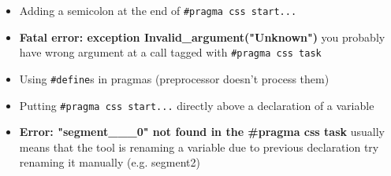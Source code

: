 \documentclass[letterpaper]{article}
\begin{document}
\begin{itemize}
  \item Adding a semicolon at the end of \verb!#pragma css start...!
  \item \textbf{{Fatal error: exception Invalid\_argument("Unknown")}} you
      probably have wrong argument at a call tagged with \verb!#pragma css task!
  \item Using \verb!#define!s in pragmas (preprocessor doesn't process them)
  \item Putting \verb!#pragma css start...! directly above a declaration of a variable
  \item \textbf{Error: "segment\_\_\_0" not found in the \#pragma css task} 
  usually means that the tool is renaming a variable due to previous declaration
  try renaming it manually (e.g. segment2)
\end{itemize}
\end{document}
